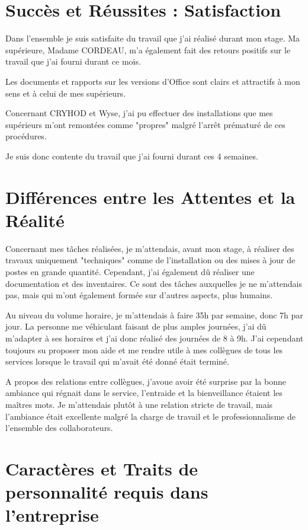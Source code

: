 \section{Succès et Réussites : Satisfaction}

Dans l'ensemble je suis satisfaite du travail que j'ai réalisé durant mon stage. Ma supérieure, Madame CORDEAU, m'a également fait des retours positifs sur le travail que j'ai fourni durant ce mois.

Les documents et rapports sur les versions d'Office sont clairs et attractifs à mon sens et à celui de mes supérieurs.

Concernant CRYHOD et Wyse, j'ai pu effectuer des installations que mes supérieurs m'ont remontées comme "propres" malgré l'arrêt prématuré de ces procédures.

Je suis donc contente du travail que j'ai fourni durant ces 4 semaines.


\section{Différences entre les Attentes et la Réalité}

Concernant mes tâches réalisées, je m’attendais, avant mon stage, à réaliser des travaux uniquement "techniques" comme de l’installation ou des mises à jour de postes en grande quantité. Cependant, j’ai également dû réaliser une documentation et des inventaires. Ce sont des tâches auxquelles je ne m’attendais pas, mais qui m’ont également formée sur d’autres aspects, plus humains.

Au niveau du volume horaire, je m’attendais à faire 35h par semaine, donc 7h par jour. La personne me véhiculant faisant de plus amples journées, j’ai dû m’adapter à ses horaires et j’ai donc réalisé des journées de 8 à 9h. J’ai cependant toujours su proposer mon aide et me rendre utile à mes collègues de tous les services lorsque le travail qui m’avait été donné était terminé.

A propos des relations entre collègues, j’avoue avoir été surprise par la bonne ambiance qui régnait dans le service, l’entraide et la bienveillance étaient les maîtres mots. Je m’attendais plutôt à une relation stricte de travail, mais l’ambiance était excellente malgré la charge de travail et le professionnalisme de l’ensemble des collaborateurs.


\section{Caractères et Traits de personnalité requis dans l'entreprise}

